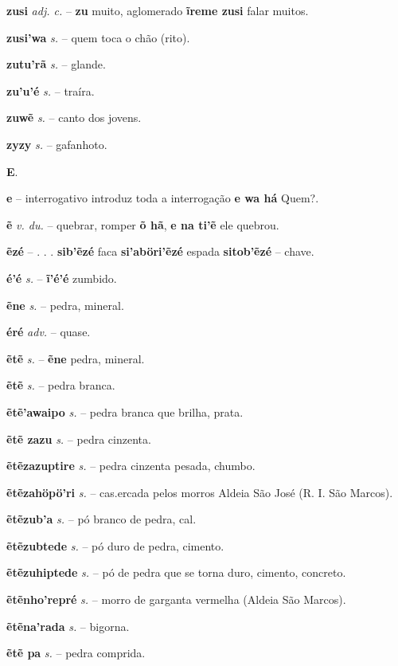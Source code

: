 \textbf{zusi} \textit{adj. c.} -- \textbf{zu} muito, aglomerado  \textbf{ĩreme zusi} falar muitos.

\textbf{zusi'wa} \textit{s.} -- quem toca o chão (rito).

\textbf{zutu'rã} \textit{s.} -- glande.

\textbf{zu'u'é} \textit{s.} -- traíra.

\textbf{zuwẽ} \textit{s.} -- canto dos jovens.

\textbf{zyzy} \textit{s.} -- gafanhoto.



\textbf{E}.



\textbf{e} -- interrogativo  introduz toda a interrogação  \textbf{e wa há} Quem?.

\textbf{ẽ} \textit{v. du.} -- quebrar, romper  \textbf{õ hã}, \textbf{e na ti'ẽ} ele quebrou.

\textbf{ẽzé} -- . . .  \textbf{sib'ẽzé} faca  \textbf{si'aböri'ẽzé} espada  \textbf{sitob'ẽzé} -- chave.

\textbf{é'é} \textit{s.} -- \textbf{ĩ'é'é} zumbido.

\textbf{ẽne} \textit{s.} -- pedra, mineral.

\textbf{éré} \textit{adv.} -- quase.

\textbf{ẽtẽ} \textit{s.} -- \textbf{ẽne} pedra, mineral.

\textbf{ẽtẽ} \textit{s.} -- pedra branca.

\textbf{ẽtẽ'awaipo} \textit{s.} -- pedra branca que brilha, prata.

\textbf{ẽtẽ zazu} \textit{s.} -- pedra cinzenta.

\textbf{ẽtẽzazuptire} \textit{s.} -- pedra cinzenta pesada, chumbo.

\textbf{ẽtẽzahöpö'ri} \textit{s.} -- cas.ercada pelos morros  Aldeia São José (R. I. São Marcos).

\textbf{ẽtẽzub'a} \textit{s.} -- pó branco de pedra, cal.

\textbf{ẽtẽzubtede} \textit{s.} -- pó duro de pedra, cimento.

\textbf{ẽtẽzuhiptede} \textit{s.} -- pó de pedra que se torna duro, cimento, concreto.

\textbf{ẽtẽnho'repré} \textit{s.} -- morro de garganta vermelha (Aldeia São Marcos).

\textbf{ẽtẽna'rada} \textit{s.} -- bigorna.

\textbf{ẽtẽ pa} \textit{s.} -- pedra comprida.

